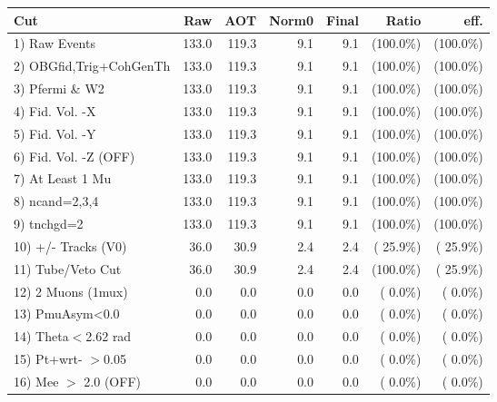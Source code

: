  \begin{table}[h!]\centering
 \begin{tabular}{||l||r|r|r|r|r|r||}
 \hline
 \hline
 Cut & Raw & AOT & Norm0 & Final & Ratio & eff.       \\
 \hline
  1) Raw Events           &        133.0 &        119.3 &          9.1 &          9.1 & (100.0\%) & (100.0\%) \\
  2) OBGfid,Trig+CohGenTh &        133.0 &        119.3 &          9.1 &          9.1 & (100.0\%) & (100.0\%) \\
  3) Pfermi \& W2         &        133.0 &        119.3 &          9.1 &          9.1 & (100.0\%) & (100.0\%) \\
  4) Fid. Vol. -X         &        133.0 &        119.3 &          9.1 &          9.1 & (100.0\%) & (100.0\%) \\
  5) Fid. Vol. -Y         &        133.0 &        119.3 &          9.1 &          9.1 & (100.0\%) & (100.0\%) \\
  6) Fid. Vol. -Z (OFF)   &        133.0 &        119.3 &          9.1 &          9.1 & (100.0\%) & (100.0\%) \\
  7) At Least 1 Mu        &        133.0 &        119.3 &          9.1 &          9.1 & (100.0\%) & (100.0\%) \\
  8) ncand=2,3,4          &        133.0 &        119.3 &          9.1 &          9.1 & (100.0\%) & (100.0\%) \\
  9) tnchgd=2             &        133.0 &        119.3 &          9.1 &          9.1 & (100.0\%) & (100.0\%) \\
 10) +/- Tracks (V0)      &         36.0 &         30.9 &          2.4 &          2.4 & ( 25.9\%) & ( 25.9\%) \\
 11) Tube/Veto Cut        &         36.0 &         30.9 &          2.4 &          2.4 & (100.0\%) & ( 25.9\%) \\
 12) 2 Muons (1mux)       &          0.0 &          0.0 &          0.0 &          0.0 & (  0.0\%) & (  0.0\%) \\
 13) PmuAsym<0.0          &          0.0 &          0.0 &          0.0 &          0.0 & (  0.0\%) & (  0.0\%) \\
 14) Theta$<$2.62 rad     &          0.0 &          0.0 &          0.0 &          0.0 & (  0.0\%) & (  0.0\%) \\
 15) Pt+wrt- $>$0.05      &          0.0 &          0.0 &          0.0 &          0.0 & (  0.0\%) & (  0.0\%) \\
 16) Mee $>$ 2.0  (OFF)   &          0.0 &          0.0 &          0.0 &          0.0 & (  0.0\%) & (  0.0\%) \\

\end{tabular}
\end{table}
